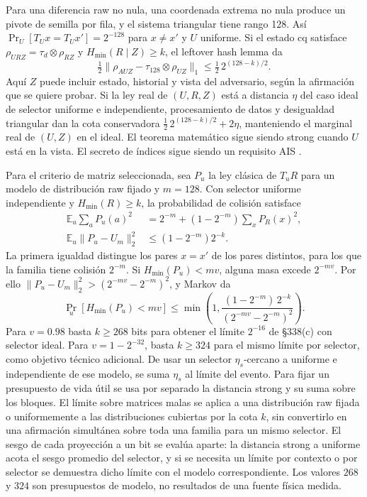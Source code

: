 \documentclass[11pt,a4paper]{article}
\newcommand{\hm}{H_{\min}}
\begin{document}
Para una diferencia raw no nula, una coordenada extrema no nula
produce un pivote de semilla por fila, y el sistema triangular
tiene rango 128. Así
\(\Pr_{U}[T_Ux=T_Ux']=2^{-128}\) para \(x\ne x'\) y \(U\)
uniforme. Si el estado cq satisface
\(\rho_{URZ}=\tau_d\otimes\rho_{RZ}\) y
\(\hm(R\mid Z)\ge k\), el leftover hash lemma da
\[
 \tfrac12\big\|\rho_{AUZ}-\tau_{128}\otimes\rho_{UZ}\big\|_1
 \le \tfrac12\,2^{(128-k)/2}.
 \]
Aquí \(Z\) puede incluir estado, historial y vista del adversario,
según la afirmación que se quiere probar. Si la ley real de
\((U,R,Z)\) está a distancia \(\eta\) del caso ideal de selector
uniforme e independiente, procesamiento de datos y desigualdad
triangular dan la cota conservadora \(\tfrac12\,2^{(128-k)/2}+2\eta\),
manteniendo el marginal real de \((U,Z)\) en el ideal.
El teorema matemático sigue siendo strong cuando \(U\) está
en la vista. El secreto de índices sigue siendo un requisito AIS
\cite[§§338, 641--648]{ais}\cite{lhl}.

Para el criterio de matriz seleccionada, sea \(P_u\) la ley
clásica de \(T_uR\) para un modelo de distribución raw fijado
y \(m=128\). Con selector uniforme independiente y
\(\hm(R)\ge k\), la probabilidad de colisión satisface
\[
 \begin{aligned}
 \mathbb E_u \sum_a P_u(a)^2
 &= 2^{-m}+(1-2^{-m})\sum_x P_R(x)^2,\\
 \mathbb E_u\|P_u-U_m\|_2^2
 &\le(1-2^{-m})2^{-k}.
 \end{aligned}
\]
La primera igualdad distingue los pares \(x=x'\) de los pares
distintos, para los que la familia tiene colisión \(2^{-m}\).
Si \(H_{\min}(P_u)<mv\), alguna masa excede \(2^{-mv}\).
Por ello \(\|P_u-U_m\|_2^2>(2^{-mv}-2^{-m})^2\), y Markov da
\begin{equation}
 \Pr_u[H_{\min}(P_u)<mv]\le
 \min\left(1,\frac{(1-2^{-m})\,2^{-k}}
                   {(2^{-mv}-2^{-m})^2}\right).
 \label{eq:toeplitz-tail}
\end{equation}
Para \(v=0.98\) basta \(k\ge268\) bits para obtener el límite
\(2^{-16}\) de §338(c) con selector ideal. Para
\(v=1-2^{-32}\), basta \(k\ge324\) para el mismo límite por
selector, como objetivo técnico adicional. De usar un selector
\(\eta_s\)-cercano a uniforme e independiente de ese modelo,
se suma \(\eta_s\) al límite del evento. Para fijar un presupuesto
de vida útil se usa por separado la distancia strong y su suma
sobre los bloques. El límite sobre matrices malas se aplica
a una distribución raw fijada o uniformemente a las distribuciones
cubiertas por la cota \(k\), sin convertirlo en una afirmación
simultánea sobre toda una familia para un mismo selector.
El sesgo de cada proyección a un bit se evalúa aparte:
la distancia strong a uniforme acota el sesgo promedio del
selector, y si se necesita un límite por contexto o por selector
se demuestra dicho límite con el modelo correspondiente.
Los valores \(268\) y \(324\) son presupuestos de modelo, no
resultados de una fuente física medida.
\end{document}

